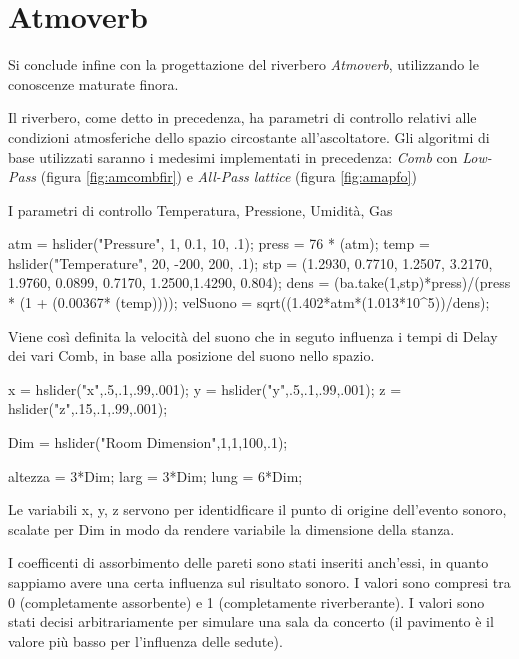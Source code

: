 \section{Atmoverb}

Si conclude infine con la progettazione del riverbero \emph{Atmoverb},
utilizzando le conoscenze maturate finora.

Il riverbero, come detto in precedenza, ha parametri di controllo relativi alle
condizioni atmosferiche dello spazio circostante all'ascoltatore. %
Gli algoritmi di base utilizzati saranno i medesimi implementati in precedenza:
\emph{Comb} con \emph{Low-Pass} (figura \ref{fig:amcombfir}) e
\emph{All-Pass lattice} (figura \ref{fig:amapfo})

I parametri di controllo Temperatura, Pressione, Umidità, Gas

\begin{code}
atm = hslider("Pressure", 1, 0.1, 10, .1);
press = 76 * (atm);
temp = hslider("Temperature", 20, -200, 200, .1);
stp = (1.2930, 0.7710, 1.2507, 3.2170, 1.9760, 0.0899, 0.7170, 1.2500,1.4290, 0.804);
dens = (ba.take(1,stp)*press)/(press * (1 + (0.00367* (temp))));
velSuono = sqrt((1.402*atm*(1.013*10^5))/dens);
\end{code}


Viene così definita la velocità del suono che in seguto influenza i tempi di
Delay dei vari Comb, in base alla posizione del suono nello spazio.

\begin{code}
x = hslider("x",.5,.1,.99,.001);
y = hslider("y",.5,.1,.99,.001);
z = hslider("z",.15,.1,.99,.001);

Dim = hslider("Room Dimension",1,1,100,.1);

altezza = 3*Dim;
larg = 3*Dim;
lung = 6*Dim;
\end{code}


Le variabili x, y, z servono per identidficare il punto di origine dell'evento sonoro, scalate
per Dim in modo da rendere variabile la dimensione della stanza.

I coefficenti di assorbimento delle pareti sono stati inseriti anch'essi, in quanto sappiamo
avere una certa influenza sul risultato sonoro. I valori sono compresi tra 0
(completamente assorbente) e 1 (completamente riverberante). I valori sono stati decisi
arbitrariamente per simulare una sala da concerto (il pavimento è il valore più basso per
l'influenza delle sedute).

